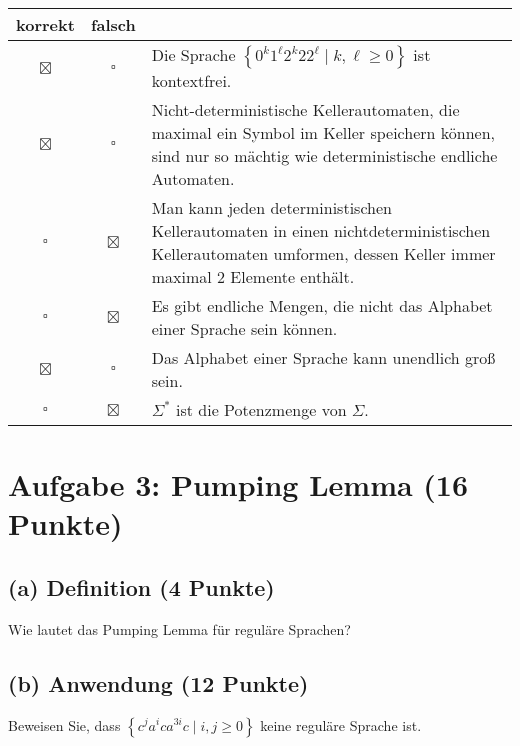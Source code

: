 \documentclass{scrartcl}
\begin{document}
\newcommand{\mpsol}{\colorbox{lightgray!20}{$\boxtimes$}}
\renewcommand{\mp}{\colorbox{lightgray!20}{$\square$}}

{\renewcommand{\arraystretch}{1.4}
\begin{tabularx}{\textwidth}{ccX}
   korrekt & falsch & \\ \hline
   \mpsol & \mp & Die Sprache $\left\{0^k1^\ell2^k22^\ell \mid k,\ell\ge 0\right\}$ ist kontextfrei.\\
   \mpsol & \mp & Nicht-deterministische Kellerautomaten, die maximal ein Symbol im Keller
   speichern können, sind nur so mächtig wie deterministische
   endliche Automaten. \\
   \mp & \mpsol & Man kann jeden deterministischen Kellerautomaten in einen
   nichtdeterministischen Kellerautomaten umformen, dessen Keller immer maximal 2
   Elemente enthält.\\
   \mp & \mpsol & Es gibt endliche Mengen, die nicht das Alphabet einer Sprache
   sein können. \\
   \mpsol & \mp & Das Alphabet einer Sprache kann unendlich groß sein.\\
   \mp & \mpsol & $\Sigma^*$ ist die Potenzmenge von $\Sigma$.
\end{tabularx}}


\section*{Aufgabe 3: Pumping Lemma \hfill (16 Punkte)}
\subsection*{(a) Definition \hfill \normalfont (4 Punkte)}
Wie lautet das Pumping Lemma für reguläre Sprachen?

\noindent{}

\subsection*{(b) Anwendung \hfill \normalfont (12 Punkte)}
Beweisen Sie, dass $\left\{c^ja^ica^{3i}c \mid i,j \ge 0\right\}$ keine 
reguläre Sprache ist.
\end{document}
